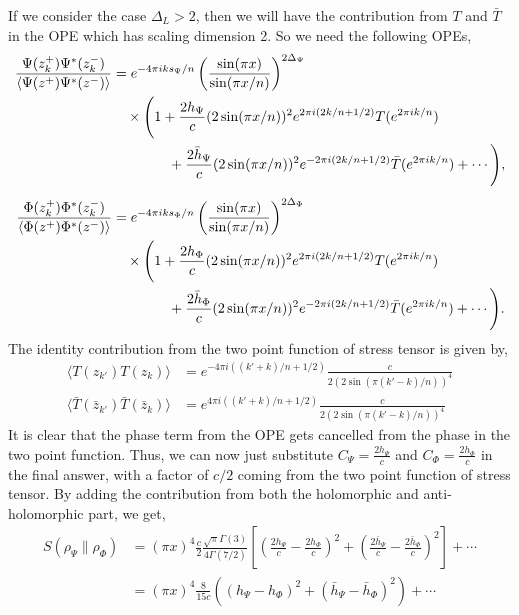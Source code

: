 \documentclass[11pt]{article}
\newcommand{\nn}{\nonumber}
\newcommand{\lb}{\left(}
\newcommand{\rb}{\right)}
\begin{document}
If we consider the case $\Delta_L>2$, then we will have the contribution from $T$ and $\bar T$ in the OPE which has scaling dimension 2. So we need the following OPEs,
\begin{align}
\frac{\Psi(z_{k}^{+})\Psi^*(z_{k}^{-})}
     {\braket{\Psi(z^+)\Psi^*(z^-)}}
&=
e^{-4\pi i k s_{\Psi}/n}
\left(
\frac{\sin(\pi x)}{\sin(\pi x/n)}
\right)^{2\Delta_{\Psi}}
\nonumber\\
&\quad\times
\Bigg(
1
+\frac{2h_\Psi}{c}(2\sin(\pi x/n))^{2}
 e^{2\pi i(2k/n+1/2)}
 T(e^{2\pi i k/n})
\nonumber\\
&\qquad \qquad
+\frac{2\bar h_\Psi}{c}(2\sin(\pi x/n))^{2}
 e^{-2\pi i(2k/n+1/2)}
 \bar T(e^{2\pi i k/n})
+\cdots
\Bigg),
\\[1ex]
\frac{\Phi(z_{k}^{+})\Phi^*(z_{k}^{-})}
     {\braket{\Phi(z^+)\Phi^*(z^-)}}
&=
e^{-4\pi i k s_{\Phi}/n}
\left(
\frac{\sin(\pi x)}{\sin(\pi x/n)}
\right)^{2\Delta_{\Phi}}
\nonumber\\
&\quad\times
\Bigg(
1
+\frac{2h_\Phi}{c}(2\sin(\pi x/n))^{2}
 e^{2\pi i(2k/n+1/2)}
 T(e^{2\pi i k/n})
\nonumber\\
&\qquad \qquad
+\frac{2\bar h_\Phi}{c}(2\sin(\pi x/n))^{2}
 e^{-2\pi i(2k/n+1/2)}
 \bar T(e^{2\pi i k/n})
+\cdots
\Bigg).
\end{align}
The identity contribution from the two point function of stress tensor is given by,
\begin{align}
    \langle T (z_{k'})T(z_k) \rangle &= e^{-4\pi i ((k'+k)/n + 1/2)}\frac{c}{2(2\sin(\pi (k'-k)/n))^4} \\
    \langle \bar T (\bar z_{k'})\bar T(\bar z_k) \rangle &= e^{4\pi i ((k'+k)/n + 1/2)}\frac{c}{2(2\sin(\pi (k'-k)/n))^4} 
\end{align}
It is clear that the phase term from the OPE gets cancelled from the phase in the two point function. Thus, we can now just substitute $C_\Psi = \frac{2h_\Psi}{c}$ and $C_\Phi = \frac{2h_\Phi}{c}$ in the final answer, with a factor of $c/2$ coming from the two point function of stress tensor. By adding the contribution from both the holomorphic and anti-holomorphic part, we get,
\begin{align}
    S(\rho_\Psi \| \rho_\Phi) &= (\pi x)^4\frac{c}{2} \frac{\sqrt{\pi}\Gamma(3)}{4\Gamma(7/2)}\left[\lb \frac{2h_\Psi}{c}- \frac{2h_\Phi}{c} \rb ^2 + \lb \frac{2\bar h_\Psi}{c}- \frac{2\bar h_\Phi}{c} \rb ^2  \right]+\cdots \nn\\
    &= (\pi x)^4\frac{8}{15c}\lb (h_\Psi - h_\Phi)^2 + (\bar h_\Psi - \bar h_\Phi)^2 \rb + \cdots
\end{align}
\end{document}

